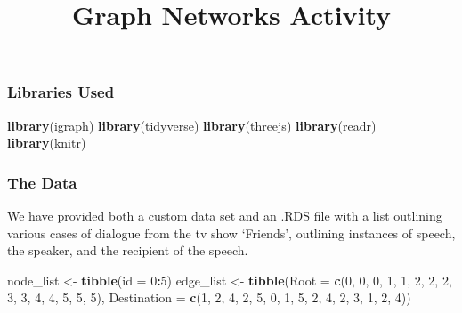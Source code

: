 \documentclass[]{article}
\title{Graph Networks Activity}
\author{}
\date{}
\newenvironment{Shaded}{\begin{snugshade}}{\end{snugshade}}
\newcommand{\KeywordTok}[1]{\textcolor[rgb]{0.13,0.29,0.53}{\textbf{#1}}}
\newcommand{\DataTypeTok}[1]{\textcolor[rgb]{0.13,0.29,0.53}{#1}}
\newcommand{\DecValTok}[1]{\textcolor[rgb]{0.00,0.00,0.81}{#1}}
\newcommand{\StringTok}[1]{\textcolor[rgb]{0.31,0.60,0.02}{#1}}
\newcommand{\OperatorTok}[1]{\textcolor[rgb]{0.81,0.36,0.00}{\textbf{#1}}}
\newcommand{\NormalTok}[1]{#1}
\begin{document}
\maketitle

\subsubsection{Libraries Used}\label{libraries-used}

\begin{Shaded}
\begin{Highlighting}[]
\KeywordTok{library}\NormalTok{(igraph)}
\KeywordTok{library}\NormalTok{(tidyverse)}
\KeywordTok{library}\NormalTok{(threejs)}
\KeywordTok{library}\NormalTok{(readr)}
\KeywordTok{library}\NormalTok{(knitr)}
\end{Highlighting}
\end{Shaded}

\subsubsection{The Data}\label{the-data}

We have provided both a custom data set and an .RDS file with a list
outlining various cases of dialogue from the tv show `Friends',
outlining instances of speech, the speaker, and the recipient of the
speech.

\begin{Shaded}
\begin{Highlighting}[]
\NormalTok{node_list <-}\StringTok{ }\KeywordTok{tibble}\NormalTok{(}\DataTypeTok{id =} \DecValTok{0}\OperatorTok{:}\DecValTok{5}\NormalTok{)}
\NormalTok{edge_list <-}\StringTok{ }\KeywordTok{tibble}\NormalTok{(}\DataTypeTok{Root =} \KeywordTok{c}\NormalTok{(}\DecValTok{0}\NormalTok{, }\DecValTok{0}\NormalTok{, }\DecValTok{0}\NormalTok{, }\DecValTok{1}\NormalTok{, }\DecValTok{1}\NormalTok{, }\DecValTok{2}\NormalTok{, }\DecValTok{2}\NormalTok{, }\DecValTok{2}\NormalTok{, }\DecValTok{3}\NormalTok{, }\DecValTok{3}\NormalTok{, }\DecValTok{4}\NormalTok{, }\DecValTok{4}\NormalTok{, }\DecValTok{5}\NormalTok{, }\DecValTok{5}\NormalTok{, }\DecValTok{5}\NormalTok{),}
                    \DataTypeTok{Destination =} \KeywordTok{c}\NormalTok{(}\DecValTok{1}\NormalTok{, }\DecValTok{2}\NormalTok{, }\DecValTok{4}\NormalTok{, }\DecValTok{2}\NormalTok{, }\DecValTok{5}\NormalTok{, }\DecValTok{0}\NormalTok{, }\DecValTok{1}\NormalTok{, }\DecValTok{5}\NormalTok{, }\DecValTok{2}\NormalTok{, }\DecValTok{4}\NormalTok{, }\DecValTok{2}\NormalTok{, }\DecValTok{3}\NormalTok{, }\DecValTok{1}\NormalTok{, }\DecValTok{2}\NormalTok{, }\DecValTok{4}\NormalTok{))}
\end{Highlighting}
\end{Shaded}
\end{document}
